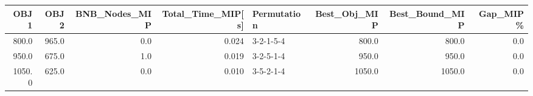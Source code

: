 \begin{tabular}{rrrrlrrr}
\toprule
   OBJ1 &   OBJ2 &  BNB\_Nodes\_MIP &  Total\_Time\_MIP[s] & Permutation &  Best\_Obj\_MIP &  Best\_Bound\_MIP &  Gap\_MIP\% \\
\midrule
  800.0 &  965.0 &            0.0 &              0.024 &   3-2-1-5-4 &         800.0 &           800.0 &       0.0 \\
  950.0 &  675.0 &            1.0 &              0.019 &   3-2-5-1-4 &         950.0 &           950.0 &       0.0 \\
 1050.0 &  625.0 &            0.0 &              0.010 &   3-5-2-1-4 &        1050.0 &          1050.0 &       0.0 \\
\bottomrule
\end{tabular}
